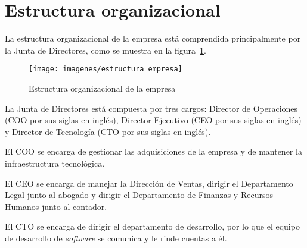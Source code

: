 \section{Estructura organizacional} \label{Estuctura organizacional}

La estructura organizacional de la empresa está comprendida principalmente por la Junta de Directores, como se muestra en la figura~\ref{fig:estructuraEmpresa}.

\begin{figure}[ht]
  \centering
  \texttt{[image: imagenes/estructura\_empresa]}
  \caption{Estructura organizacional de la empresa}
  \label{fig:estructuraEmpresa}
\end{figure}

La Junta de Directores está compuesta por tres cargos: Director de Operaciones (COO por sus siglas en inglés), Director Ejecutivo (CEO por sus siglas en inglés) y Director de Tecnología (CTO por sus siglas en inglés).

El COO se encarga de gestionar las adquisiciones de la empresa y de mantener la infraestructura tecnológica.

El CEO se encarga de manejar la Dirección de Ventas, dirigir el Departamento Legal junto al abogado y dirigir el Departamento de Finanzas y Recursos Humanos junto al contador.

El CTO se encarga de dirigir el departamento de desarrollo, por lo que el equipo de desarrollo de \textit{software} se comunica y le rinde cuentas a él.


